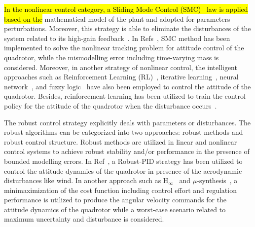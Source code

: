 \documentclass[3p]{elsarticle}
\begin{document}
\hl{In the nonlinear control category, a Sliding Mode Control (SMC)~\mbox{\cite{LABBADI2020290, MOFID2022455}} law is applied based on the }mathematical model of the plant and adopted for parameters perturbations. Moreover, this strategy is able to eliminate the disturbances of the system related to its high-gain feedback~\cite{YANG2021175}. In Refs~\cite{WU2022436}, SMC method has been implemented to solve the nonlinear tracking problem for attitude control of the quadrotor, while the mismodelling error including time-varying mass is considered. Moreover, in another strategy of nonlinear control, the intelligent approaches such as Reinforcement Learning (RL)~\mbox{\cite{Hwangbo_2017, LIN2020135}}, iterative learning~\cite{electronics10202474}, neural network~\cite{JIN202012241}, and fuzzy logic~\cite{GLIDA2022} have also been employed to control the attitude of the quadrotor. Besides, reinforcement learning has been utilized to train the control policy for the attitude of the quadrotor when the disturbance occurs~\cite{WANG2023222}.


The robust control strategy explicitly deals with parameters or disturbances. The robust algorithms can be categorized into two approaches: robust methods and robust control structure. Robust methods are utilized in linear and nonlinear control systems to achieve robust stability and/or performance in the presence of bounded modelling errors. In Ref~\cite{MIRANDACOLORADO202047}, a Robust-PID strategy has been utilized to control the attitude dynamics of the quadrotor in presence of the aerodynamic disturbances like wind. In another approach such as H$_{\infty}$~\cite{WANG201910, REKABI202081} and $\mu$-synthesis~\cite{RODRIGUEZMARTINEZ2023739}, a minimaximization of the cost function including control effort and regulation performance is utilized to produce the angular velocity commands for the attitude dynamics of the quadrotor while a worst-case scenario related to maximum uncertainty and disturbance is considered. 
\end{document}
